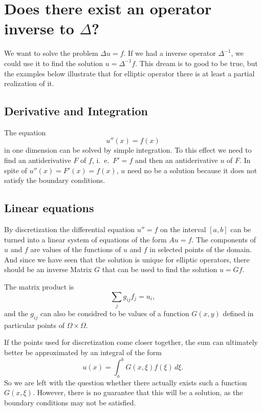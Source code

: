 %
%
%
\section{Does there exist an operator inverse to $\Delta$?}
We want to solve the problem $\Delta u=f$.
If we had a inverse operator $\Delta^{-1}$, we could use it to
find the solution $u=\Delta^{-1}f$.
This dream is to good to be true, but the examples below 
illustrate that for elliptic operator there is at least a partial
realization of it.

\subsection{Derivative and Integration}
The equation 
\[
u''(x)=f(x)
\]
in one dimension can be solved by simple integration.
To this effect we need to find an antiderivative $F$ of $f$, i.~e.~$F'=f$
and then an antiderivative $u$ of $F$.
In spite of $u''(x)=F'(x)=f(x)$, $u$ need no be a solution because
it does not satisfy the boundary conditions.

\subsection{Linear equations}
By discretization the differential equation $u''=f$ on the interval
$[a,b]$ can be turned into a linear system of equations of
the form $Au=f$.
The components of $u$ and $f$ are values of the functions of $u$ and $f$
in selected points of the domain.
And since we have seen that the solution is unique for elliptic operators,
there should be an inverse Matrix $G$ that can be used to find the
solution $u=Gf$.

The matrix product is
\[
\sum_{j}g_{ij}f_j = u_i,
\]
and the $g_{ij}$ can also be considred to be values of a function $G(x,y)$
defined in particular points of $\Omega\times\Omega$.

If the points used for discretization come closer together, the sum
can ultimately better be approximated by an integral of the form
\[
u(x)=\int_a^b G(x,\xi)f(\xi)\,d\xi.
\]
So we are left with the question whether there actually exists such
a function $G(x,\xi)$.
However, there is no guarantee that this will be a solution, as
the boundary conditions may not be satisfied.

